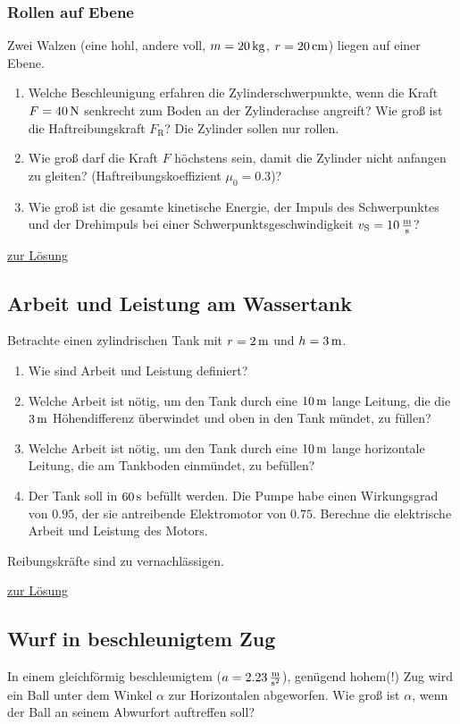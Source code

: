 \documentclass[a4paper]{scrartcl}
\begin{document}
\subsubsection{Rollen auf Ebene}
\label{aufg:WalzeFlach}
Zwei Walzen (eine hohl, andere voll, $m = \unit[20]{kg}$, $r=\unit[20]{cm}$) liegen auf einer Ebene.
\begin{enumerate}[noitemsep]
  \item Welche Beschleunigung erfahren die Zylinderschwerpunkte, wenn die Kraft $F= \unit[40]{N}$ senkrecht zum Boden an der Zylinderachse angreift? Wie groß ist die Haftreibungskraft $F_\text{R}$? Die Zylinder sollen nur rollen.
  \item Wie groß darf die Kraft $F$ höchstens sein, damit die Zylinder nicht anfangen zu gleiten? (Haftreibungskoeffizient $\mu_0 = 0.3$)?
  \item Wie groß ist die gesamte kinetische Energie, der Impuls des Schwerpunktes und der Drehimpuls bei einer Schwerpunktsgeschwindigkeit $v_\text{S} = \unit[10]{\frac{m}{s}}$?
\end{enumerate}

\hyperref[lsg:WalzeFlach]{zur Lösung}

\subsection{Arbeit und Leistung am Wassertank}
\label{aufg:Wassertank}
Betrachte einen zylindrischen Tank mit $r=\unit[2]{m}$ und $h=\unit[3]{m}$.
\begin{enumerate}[noitemsep]
  \item Wie sind Arbeit und Leistung definiert?
  \item Welche Arbeit ist nötig, um den Tank durch eine $\unit[10]{m}$ lange Leitung, die die $\unit[3]{m}$ Höhendifferenz überwindet und oben in den Tank mündet, zu füllen?
  \item Welche Arbeit ist nötig, um den Tank durch eine $\unit[10]{m}$ lange horizontale Leitung, die am Tankboden einmündet, zu befüllen?
  \item Der Tank soll in $\unit[60]{s}$ befüllt werden. Die Pumpe habe einen Wirkungsgrad von $0.95$, der sie antreibende Elektromotor von $0.75$. Berechne die elektrische Arbeit und Leistung des Motors.
\end{enumerate}
Reibungskräfte sind zu vernachlässigen.

\hyperref[lsg:Wassertank]{zur Lösung}

\subsection{Wurf in beschleunigtem Zug}
\label{aufg:WurfZug}
In einem gleichförmig beschleunigtem ($a= \unit[2.23]{\frac{m}{s^2}}$), genügend hohem(!) Zug wird ein Ball unter dem Winkel $\alpha$ zur Horizontalen abgeworfen. Wie groß ist $\alpha$, wenn der Ball an seinem Abwurfort auftreffen soll?
\end{document}
